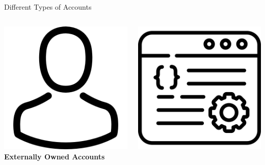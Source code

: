 \documentclass[handout]{beamer}
\begin{document}
\begin{frame}{Different Types of Accounts}

	\begin{columns}[T]
		\begin{column}{0.45\textwidth}
			\centering
			\includegraphics[scale=0.09]{../assets/images/EOA.png} \\
			\textbf{Externally Owned Accounts}
		\end{column}
		\begin{column}{0.45\textwidth}
		\centering
			\includegraphics[scale=0.093]{../assets/images/CA.png}\\

\end{column}
\end{columns}
\end{frame}
\end{document}
